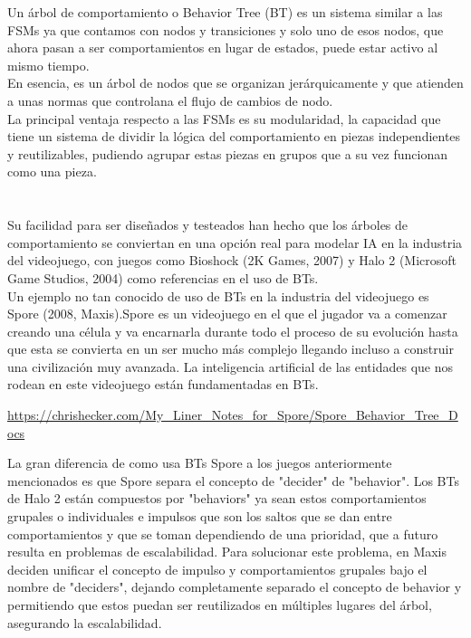 Un árbol de comportamiento o Behavior Tree (BT) es un sistema similar a las FSMs ya que contamos con nodos y transiciones y solo uno de esos nodos, que ahora pasan a ser comportamientos en lugar de estados, puede estar activo al mismo tiempo. \\
En esencia, es un árbol de nodos que se organizan jerárquicamente y que atienden a unas normas que controlana el flujo de cambios de nodo. \\
La principal ventaja respecto a las FSMs es su modularidad, la capacidad que tiene un sistema de dividir la lógica del comportamiento en piezas independientes y reutilizables, pudiendo agrupar estas piezas en grupos que a su vez funcionan como una pieza. \\
 \\\\
Su facilidad para ser diseñados y testeados han hecho que los árboles de comportamiento se conviertan en una opción real para modelar IA en la industria del videojuego, con juegos como Bioshock (2K Games, 2007) y Halo 2 (Microsoft Game Studios, 2004)  como referencias en el uso de BTs.\\
Un ejemplo no tan conocido de uso de BTs en la industria del videojuego es Spore (2008, Maxis).Spore es un videojuego en el que el jugador va a comenzar creando una célula y va encarnarla durante todo el proceso de su evolución hasta que esta se convierta en un ser mucho más complejo llegando incluso a construir una civilización muy avanzada. La inteligencia artificial de las entidades que nos rodean en este videojuego están fundamentadas en BTs.

\url{https://chrishecker.com/My_Liner_Notes_for_Spore/Spore_Behavior_Tree_Docs}

La gran diferencia de como usa BTs Spore a los juegos anteriormente mencionados es que Spore separa el concepto de "decider" de "behavior". Los BTs de Halo 2 están compuestos por "behaviors" ya sean estos comportamientos grupales o individuales e impulsos que son los saltos que se dan entre comportamientos y que se toman dependiendo de una prioridad, que a futuro resulta en problemas de escalabilidad. Para solucionar este problema, en Maxis deciden unificar el concepto de impulso y comportamientos grupales bajo el nombre de "deciders", dejando completamente separado el concepto de behavior y permitiendo que estos puedan ser reutilizados en múltiples lugares del árbol, asegurando la escalabilidad.
